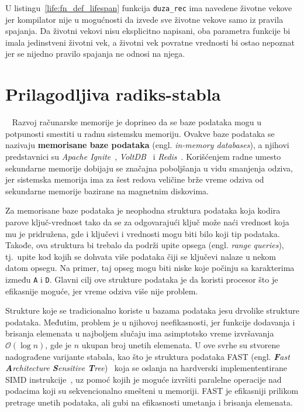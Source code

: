 \documentclass[12pt,oneside]{memoir}
\begin{document}
U listingu~\ref{life:fn_def_lifespan} funkcija \texttt{duza\_rec} ima navedene životne
vekove jer kompilator nije u mogućnosti da izvede sve životne vekove samo iz
pravila spajanja. Da životni vekovi nisu eksplicitno napisani, oba parametra funkcije
bi imala jedinstveni životni vek, a životni vek povratne vrednosti bi ostao nepoznat
jer se nijedno pravilo spajanja ne odnosi na njega.


\chapter{Prilagodljiva radiks-stabla}~\label{ch:art}
Razvoj računarske memorije je doprineo da se baze podataka
mogu u potpunosti smestiti u radnu sistemsku memoriju. Ovakve baze podataka se nazivaju
\textbf{memorisane baze podataka} (engl. \emph{in-memory databases}), a njihovi predstavnici su
\emph{Apache Ignite}~\cite{apacheIgnite}, \emph{VoltDB}~\cite{voltDB} i
\emph{Redis}~\cite{redis}. Korišćenjem radne umesto sekundarne
memorije dobijaju se značajna poboljšanja u vidu smanjenja odziva, jer sistemska memorija
ima za šest redova veličine brže vreme odziva
od sekundarne memorije bazirane na magnetnim diskovima.

Za memorisane baze podataka je neophodna struktura podataka koja kodira parove
ključ-vrednost tako da se za odgovarajući ključ može naći vrednost koja mu
je pridružena, gde i ključevi i vrednosti mogu biti bilo koji tip podataka.
Takođe, ova struktura bi trebalo da podrži upite opsega
(engl. \emph{range queries}), tj.\ upite kod kojih se dohvata više podataka
čiji se ključevi nalaze u nekom datom opsegu.
Na primer, taj opseg mogu biti niske koje počinju sa karakterima između
\texttt{A} i \texttt{D}.
Glavni cilj ove strukture podataka je da koristi procesor što je efikasnije moguće, jer
vreme odziva više nije problem.

Strukture koje se tradicionalno koriste u bazama podataka jesu
drvolike strukture podataka. Međutim, problem je u njihovoj neefikasnosti, jer
funkcije dodavanja i brisanja elemenata u najboljem slučaju ima asimptotsko vreme izvršavanja
$ \mathcal{O}(\log{}n) $, gde je $n$ ukupan broj unetih elemenata.
U ove svrhe su stvorene nadograđene varijante stabala,
kao što je struktura podataka FAST
(engl. \emph{\textbf{F}ast \textbf{A}rchitecture \textbf{S}ensitive \textbf{T}ree})~\cite{fast}
koja se oslanja na hardverski implemententirane SIMD instrukcije~\cite{simd},
uz pomoć kojih je moguće izvršiti paralelne operacije nad podacima koji su
sekvencionalno smešteni u memoriji.
FAST je efikasniji prilikom pretrage unetih podataka,
ali gubi na efikasnosti umetanja i brisanja elemenata.
\end{document}
